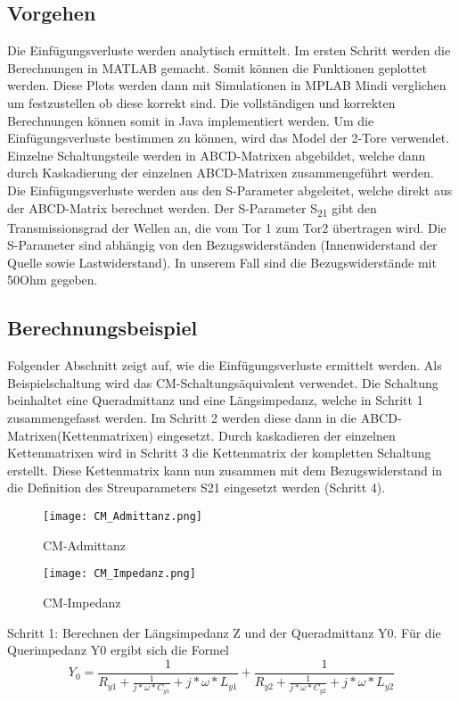 \subsection{Vorgehen} \label{subsec:vorgehen}
Die Einfügungsverluste werden analytisch ermittelt. Im ersten Schritt werden die Berechnungen in MATLAB gemacht. Somit können die Funktionen  geplottet werden. Diese Plots werden dann mit Simulationen in MPLAB Mindi verglichen um festzustellen ob diese korrekt sind. Die vollständigen und korrekten Berechnungen können somit in Java implementiert werden. Um die Einfügungsverluste bestimmen zu können, wird das Model der 2-Tore verwendet. Einzelne Schaltungsteile werden in ABCD-Matrixen abgebildet, welche dann durch Kaskadierung der einzelnen ABCD-Matrixen zusammengeführt werden. Die Einfügungsverluste werden aus den S-Parameter abgeleitet, welche direkt aus der ABCD-Matrix berechnet werden.
Der S-Parameter S\textsubscript{21} gibt den Transmissionsgrad der Wellen an, die vom Tor 1 zum Tor2 übertragen wird. Die S-Parameter sind abhängig von den Bezugswiderständen (Innenwiderstand der Quelle sowie Lastwiderstand). In unserem Fall sind die Bezugswiderstände mit 50Ohm gegeben.

\newpage
\subsection{Berechnungsbeispiel} \label{subsec:beispiel}
Folgender Abschnitt zeigt auf, wie die Einfügungsverluste ermittelt werden. Als Beispielschaltung wird das CM-Schaltungsäquivalent verwendet. Die Schaltung beinhaltet eine Queradmittanz und eine Längsimpedanz, welche in Schritt 1 zusammengefasst werden. Im Schritt 2 werden diese dann in die ABCD-Matrixen(Kettenmatrixen) eingesetzt. Durch kaskadieren der einzelnen Kettenmatrixen wird in Schritt 3 die Kettenmatrix der kompletten Schaltung erstellt. Diese Kettenmatrix kann nun zusammen mit dem Bezugswiderstand in die Definition des Streuparameters S21 eingesetzt werden (Schritt 4).

\begin{figure}[H]
	\centering
	\texttt{[image: CM\_Admittanz.png]}
	\caption{CM-Admittanz}
	\label{fig:CM-Admittanz}
\end{figure}
\begin{figure}[H]
	\centering
	\texttt{[image: CM\_Impedanz.png]}
	\caption{CM-Impedanz}
	\label{fig:CM-Impedanz}
\end{figure}
Schritt 1: Berechnen der Längsimpedanz Z und der Queradmittanz Y0.
Für die Querimpedanz Y0 ergibt sich die Formel
\begin{equation}
Y_0 = \frac{ 1 }{R_{y1} + \frac{1}{j*\omega*C_{y1}}+j*\omega*L_{y1}} +\frac{ 1 }{R_{y2} + \frac{1}{j*\omega*C_{y2}}+j*\omega*L_{y2}}
\end{equation}

